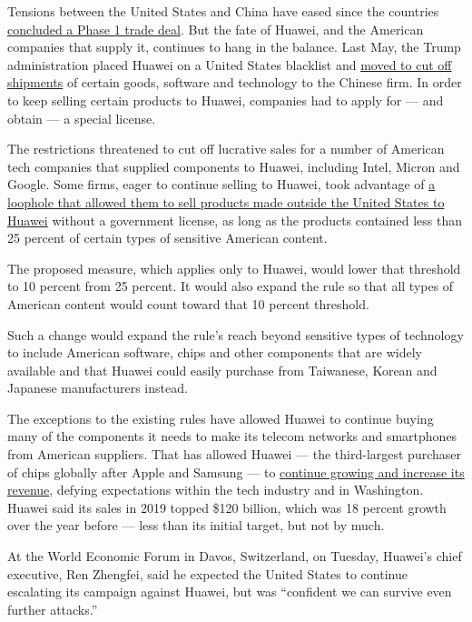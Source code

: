 Tensions between the United States and China have eased since the
countries
\href{https://www.nytimes.com/2020/01/15/business/economy/china-trade-deal.html}{concluded
a Phase 1 trade deal}. But the fate of Huawei, and the American
companies that supply it, continues to hang in the balance. Last May,
the Trump administration placed Huawei on a United States blacklist and
\href{https://www.nytimes.com/2019/07/30/technology/huawei-trump.html}{moved
to cut off shipments} of certain goods, software and technology to the
Chinese firm. In order to keep selling certain products to Huawei,
companies had to apply for --- and obtain --- a special license.

The restrictions threatened to cut off lucrative sales for a number of
American tech companies that supplied components to Huawei, including
Intel, Micron and Google. Some firms, eager to continue selling to
Huawei, took advantage of
\href{https://www.nytimes.com/2019/06/25/technology/huawei-trump-ban-technology.html}{a
loophole that allowed them to sell products made outside the United
States to Huawei} without a government license, as long as the products
contained less than 25 percent of certain types of sensitive American
content.

The proposed measure, which applies only to Huawei, would lower that
threshold to 10 percent from 25 percent. It would also expand the rule
so that all types of American content would count toward that 10 percent
threshold.

Such a change would expand the rule's reach beyond sensitive types of
technology to include American software, chips and other components that
are widely available and that Huawei could easily purchase from
Taiwanese, Korean and Japanese manufacturers instead.

The exceptions to the existing rules have allowed Huawei to continue
buying many of the components it needs to make its telecom networks and
smartphones from American suppliers. That has allowed Huawei --- the
third-largest purchaser of chips globally after Apple and Samsung --- to
\href{https://www.nytimes.com/2019/12/30/business/huawei-revenue-growth.html}{continue
growing and increase its revenue}, defying expectations within the tech
industry and in Washington. Huawei said its sales in 2019 topped \$120
billion, which was 18 percent growth over the year before --- less than
its initial target, but not by much.

At the World Economic Forum in Davos, Switzerland, on Tuesday, Huawei's
chief executive, Ren Zhengfei, said he expected the United States to
continue escalating its campaign against Huawei, but was ``confident we
can survive even further attacks.''

